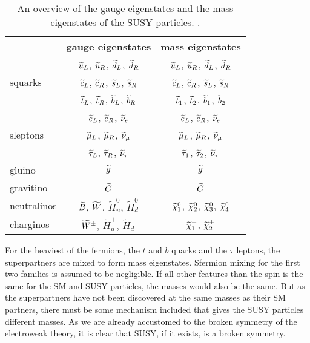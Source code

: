 \begin{table}[ht!]
\def\arraystretch{1.2}
\setlength{\belowcaptionskip}{6pt}
\small
\centering
\caption{An overview of the gauge eigenstates and the mass eigenstates of the SUSY particles. \cite{Martin:1997ns}.}
\label{tab:eigenstates}
\begin{tabular}{l c c}
        \hline \hline
                                 & gauge eigenstates                                                 & mass eigenstates \\\hline
        \multirow{3}{*}{squarks} & $\widetilde{u}_{L}$, $\widetilde{u}_{R}$, $\widetilde{d}_{L}$, $\widetilde{d}_{R}$                            & $\widetilde{u}_{L}$, $\widetilde{u}_{R}$, $\widetilde{d}_{L}$, $\widetilde{d}_{R}$\\
                                 & $\widetilde{c}_{L}$, $\widetilde{c}_{R}$, $\widetilde{s}_{L}$, $\widetilde{s}_{R}$                                    & $\widetilde{c}_{L}$, $\widetilde{c}_{R}$, $\widetilde{s}_{L}$, $\widetilde{s}_{R}$\\
                                 & $\widetilde{t}_{L}$, $\widetilde{t}_{R}$, $\widetilde{b}_{L}$, $\widetilde{b}_{R}$                                    & $\widetilde{t}_{1}$, $\widetilde{t}_{2}$, $\widetilde{b}_{1}$, $\widetilde{b}_{2}$\\\hline
        \multirow{3}{*}{sleptons}& $\widetilde{e}_{L}$, $\widetilde{e}_{R}$, $\widetilde{\nu}_{e}$                                          & $\widetilde{e}_{L}$, $\widetilde{e}_{R}$, $\widetilde{\nu}_{e}$\\
                                 & $\widetilde{\mu}_{L}$, $\widetilde{\mu}_{R}$, $\widetilde{\nu}_{\mu}$                                        & $\widetilde{\mu}_{L}$, $\widetilde{\mu}_{R}$, $\widetilde{\nu}_{\mu}$\\
                                 & $\widetilde{\tau}_{L}$, $\widetilde{\tau}_{R}$, $\widetilde{\nu}_{\tau}$                                      & $\widetilde{\tau}_{1}$, $\widetilde{\tau}_{2}$, $\widetilde{\nu}_{\tau}$\\\hline
        gluino                   & $\widetilde{g}$                                                         & $\widetilde{g}$\\\hline
        gravitino                & $\widetilde{G}$                                                      & $\widetilde{G}$\\\hline
        neutralinos              & $\widetilde{B}$, $\widetilde{W}$, $\widetilde{H}^{0}_{u}$, $\widetilde{H}^{0}_{d}$& $\widetilde{\chi}^{0}_{1}$, $\widetilde{\chi}^{0}_{2}$, $\widetilde{\chi}^{0}_{3}$, $\widetilde{\chi}^{0}_{4}$\\\hline
        charginos                & $\widetilde{W}^{\pm}$, $\widetilde{H}^{+}_{u}$, $\widetilde{H}^{-}_{d}$   & $\widetilde{\chi}^\pm_{1}$, $\widetilde{\chi}^\pm_{2}$\\
\hline\hline
\end{tabular}
\end{table}                                                                                                                                                                                             
For the heaviest of the fermions, the $t$ and $b$ quarks and the $\tau$ leptons, the superpartners are mixed to form mass eigenstates. 
Sfermion mixing for the first two families is assumed to be negligible.  
If all other features than the spin is the same for the SM and SUSY particles, the masses would also be the same. 
But as the superpartners have not been discovered at the same masses as their SM partners, there must be some mechanism included that gives the SUSY particles different masses. 
As we are already accustomed to the broken symmetry of the electroweak theory, it is clear that SUSY, if it exists, is a broken symmetry. 
